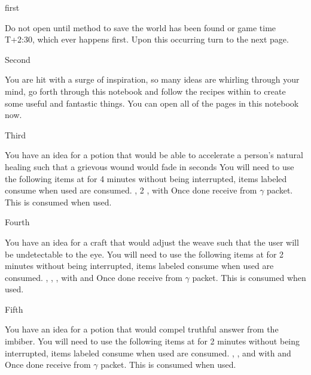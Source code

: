 \documentclass[greennotebook]{guildcamp3} %
\begin{document}
\startnotebook{\nMagOneRecipes{}}

\begin{page}{first}
	
	Do not open until method to save the world has been found or game time T+2:30, which ever happens first. Upon this occurring turn to the next page.
	
\end{page}

\begin{page}{Second}
	
	You are hit with a surge of inspiration, so many ideas are whirling through your mind, go forth through this notebook and follow the recipes within to create some useful and fantastic things. You can open all of the pages in this notebook now.
	
\end{page}

\begin{page}{Third}
	
	You have an idea for a potion that would be able to accelerate a person's natural healing such that a grievous wound would fade in seconds
	You will need to use the following items at \sMageWorkbench{} for 4 minutes without being interrupted, items labeled consume when used are consumed.
	\iPhoenixFeather{}, 2 \iHolyWater{}, \iUnicornHoof{} with \iMortarPestle{}
	Once done receive \iHealthRemedy{} from $\gamma$ packet. This is consumed when used. 
	
\end{page}

\begin{page}{Fourth}
	
	You have an idea for a craft that would adjust the weave such that the user will be undetectable to the eye.
	You will need to use the following items at\sMageWorkbench{} for 2 minutes without being interrupted, items labeled consume when used are consumed.
	\iDragonSkin{}, \iStardust{}, \iHolyWater{}, with \iQuartz{} and \iRabbitsFoot{}
	Once done receive \iInvisibilityCloak{} from $\gamma$ packet. This is consumed when used.  
	
\end{page}

\begin{page}{Fifth}
	
	You have an idea for a potion that would compel truthful answer from the imbiber.
	You will need to use the following items at \sMageWorkbench{} for 2 minutes without being interrupted, items labeled consume when used are consumed.
	\iBelladonna{}, \iUnicornHoof{}, and \iHolyWater{} with \iCauldron{} and \iVial{}
	Once done receive \iTruthPotion{} from $\gamma$ packet. This is consumed when used. 
	
\end{page}
\end{document}
